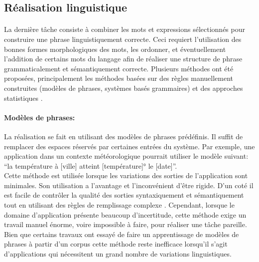 	\subsection{Réalisation linguistique}
	\paragraph{}
	La dernière tâche consiste à combiner les mots et expressions sélectionnés pour construire une phrase linguistiquement correcte. Ceci requiert l’utilisation des bonnes formes morphologiques des mots, les ordonner, et éventuellement  l’addition de certains mots du langage afin de réaliser une structure de phrase grammaticalement et sémantiquement correcte. Plusieurs méthodes ont été proposées, principalement les méthodes basées sur des règles manuellement construites (modèles de phrases, systèmes basés grammaires) et des approches statistiques \cite{Gatt2018}.
	\paragraph{Modèles de phrases:} La réalisation se fait en utilisant des modèles de phrases prédéfinis. Il suffit de remplacer des espaces réservés par certaines entrées du système. Par exemple, une application dans un contexte météorologique pourrait utiliser le modèle suivant: “la température à [ville] atteint [température]° le [date]”.\\
Cette méthode est utilisée lorsque les variations des sorties de l’application sont minimales. Son utilisation a l’avantage et l’inconvénient d’être rigide. D’un coté il est facile de contrôler la qualité des sorties syntaxiquement et sémantiquement tout en utilisant des règles de remplissage complexe \cite{Theune2001}. Cependant, lorsque le domaine d’application présente beaucoup d’incertitude, cette méthode exige un travail manuel énorme, voire impossible à faire, pour réaliser une tâche pareille. Bien que certains travaux ont essayé de faire un apprentissage de modèles de phrases à partir d’un corpus\cite{Angeli2012} cette méthode reste inefficace lorsqu’il s’agit d’applications qui nécessitent un grand nombre de variations linguistiques.
